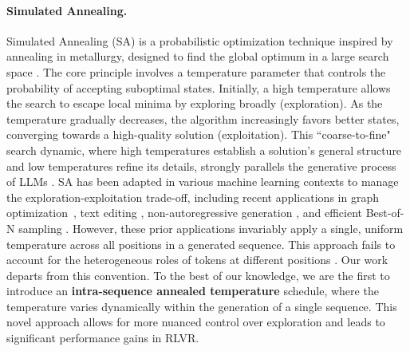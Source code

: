 \paragraph{Simulated Annealing.} 
Simulated Annealing (SA) is a probabilistic optimization technique inspired by annealing in metallurgy, designed to find the global optimum in a large search space \citep{kirkpatrick1983optimization, bertsimas1993simulated}. The core principle involves a temperature parameter that controls the probability of accepting suboptimal states. Initially, a high temperature allows the search to escape local minima by exploring broadly (exploration). As the temperature gradually decreases, the algorithm increasingly favors better states, converging towards a high-quality solution (exploitation).
This ``coarse-to-fine" search dynamic, where high temperatures establish a solution's general structure and low temperatures refine its details, strongly parallels the generative process of LLMs \citep{yang2025alignment}. SA has been adapted in various machine learning contexts to manage the exploration-exploitation trade-off, including recent applications in graph optimization~\citep{liu2021simulated}, text editing \citep{zhang2024edt}, non-autoregressive generation \citep{israel2025enabling}, and efficient Best-of-N sampling \citep{manvi2024adaptive}. However, these prior applications invariably apply a single, uniform temperature across all positions in a generated sequence. This approach fails to account for the heterogeneous roles of tokens at different positions \citep{wang2025beyond}. Our work departs from this convention. To the best of our knowledge, we are the first to introduce an \textbf{intra-sequence annealed temperature} schedule, where the temperature varies dynamically within the generation of a single sequence. This novel approach allows for more nuanced control over exploration and leads to significant performance gains in RLVR.
